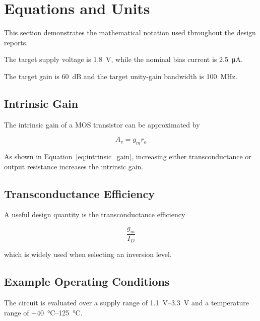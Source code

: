 
\section{Equations and Units}
\label{sec:equations_units}
This section demonstrates the mathematical notation used throughout
the design reports.

The target supply voltage is \SI{1.8}{\volt}, while the nominal bias
current is \SI{2.5}{\micro\ampere}.

The target gain is \SI{60}{\deci\bel} and the target unity-gain
bandwidth is \SI{100}{\mega\hertz}.

\subsection{Intrinsic Gain}

The intrinsic gain of a MOS transistor can be approximated by

\begin{equation}
	A_v = g_m r_o
	\label{eq:intrinsic_gain}
\end{equation}

As shown in Equation~\ref{eq:intrinsic_gain}, increasing either
transconductance or output resistance increases the intrinsic gain.

\subsection{Transconductance Efficiency}

A useful design quantity is the transconductance efficiency

\begin{equation}
	\frac{g_m}{I_D}
	\label{eq:gm_id}
\end{equation}

which is widely used when selecting an inversion level.

\subsection{Example Operating Conditions}

The circuit is evaluated over a supply range of
\SIrange{1.1}{3.3}{\volt}
and a temperature range of
\SIrange{-40}{125}{\degreeCelsius}.